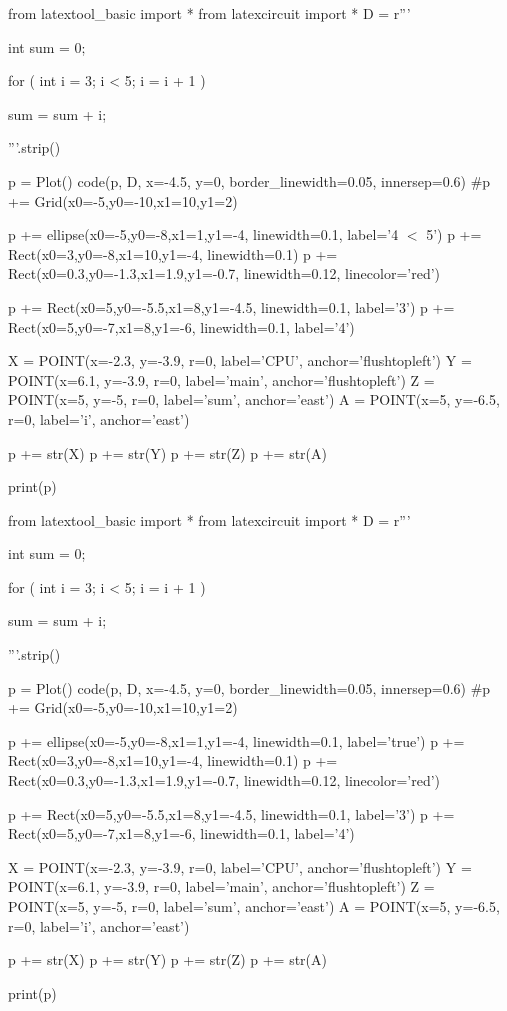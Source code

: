 \begin{python}
from latextool_basic import *
from latexcircuit import *
D = r'''



int sum = 0;

    for ( int i = 3;     i < 5;     i = i + 1 )


        sum = sum + i;



'''.strip()

p = Plot()
code(p, D, x=-4.5, y=0, border_linewidth=0.05, innersep=0.6)
#p += Grid(x0=-5,y0=-10,x1=10,y1=2)

p += ellipse(x0=-5,y0=-8,x1=1,y1=-4, linewidth=0.1, label='4 $<$ 5')
p += Rect(x0=3,y0=-8,x1=10,y1=-4, linewidth=0.1)
p += Rect(x0=0.3,y0=-1.3,x1=1.9,y1=-0.7, linewidth=0.12, linecolor='red')

p += Rect(x0=5,y0=-5.5,x1=8,y1=-4.5, linewidth=0.1, label='3')
p += Rect(x0=5,y0=-7,x1=8,y1=-6, linewidth=0.1, label='4')

X = POINT(x=-2.3, y=-3.9, r=0, label='CPU', anchor='flushtopleft')
Y = POINT(x=6.1, y=-3.9, r=0, label='main', anchor='flushtopleft')
Z = POINT(x=5, y=-5, r=0, label='sum', anchor='east')
A = POINT(x=5, y=-6.5, r=0, label='i', anchor='east')

p += str(X)
p += str(Y)
p += str(Z)
p += str(A)

print(p)
\end{python}

\begin{python}
from latextool_basic import *
from latexcircuit import *
D = r'''



int sum = 0;

    for ( int i = 3;     i < 5;     i = i + 1 )


        sum = sum + i;



'''.strip()

p = Plot()
code(p, D, x=-4.5, y=0, border_linewidth=0.05, innersep=0.6)
#p += Grid(x0=-5,y0=-10,x1=10,y1=2)

p += ellipse(x0=-5,y0=-8,x1=1,y1=-4, linewidth=0.1, label='true')
p += Rect(x0=3,y0=-8,x1=10,y1=-4, linewidth=0.1)
p += Rect(x0=0.3,y0=-1.3,x1=1.9,y1=-0.7, linewidth=0.12, linecolor='red')

p += Rect(x0=5,y0=-5.5,x1=8,y1=-4.5, linewidth=0.1, label='3')
p += Rect(x0=5,y0=-7,x1=8,y1=-6, linewidth=0.1, label='4')

X = POINT(x=-2.3, y=-3.9, r=0, label='CPU', anchor='flushtopleft')
Y = POINT(x=6.1, y=-3.9, r=0, label='main', anchor='flushtopleft')
Z = POINT(x=5, y=-5, r=0, label='sum', anchor='east')
A = POINT(x=5, y=-6.5, r=0, label='i', anchor='east')

p += str(X)
p += str(Y)
p += str(Z)
p += str(A)

print(p)
\end{python}

